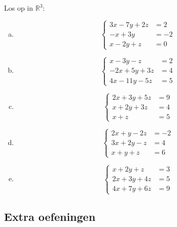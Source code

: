 \documentclass[12pt,twoside]{article}
\begin{document}
\begin{oefening}
Los op in $\mathbb{R}^3$:
\begin{multicols}{2}
\begin{enumerate}[(a)]
  \item$$\left\{
    \begin{aligned}
      3x - 7y + 2z &= 2\\
      -x + 3y      &= -2\\
      x  - 2y +  z &= 0
    \end{aligned}\right.$$
  \item$$\left\{
    \begin{aligned}
        x - 3y -  z &= 2\\
      -2x + 5y + 3z &= 4\\
       4x -11y - 5z &= 5
    \end{aligned}\right.$$
  \item$$\left\{
    \begin{aligned}
      2x + 3y + 5z &= 9\\
       x + 2y + 3z &= 4\\
       x +  z &= 5
    \end{aligned}\right.$$
  \item$$\left\{
    \begin{aligned}
      2x +  y - 2z &= -2\\
      3x + 2y -  z &=  4\\
       x +  y +  z &=  6
    \end{aligned}\right.$$
  \item$$\left\{
    \begin{aligned}
       x + 2y +  z &= 3\\
      2x + 3y + 4z &= 5\\
      4x + 7y + 6z &= 9
    \end{aligned}\right.$$
\end{enumerate}
\end{multicols}
\end{oefening}

\subsection{Extra oefeningen}
\end{document}
